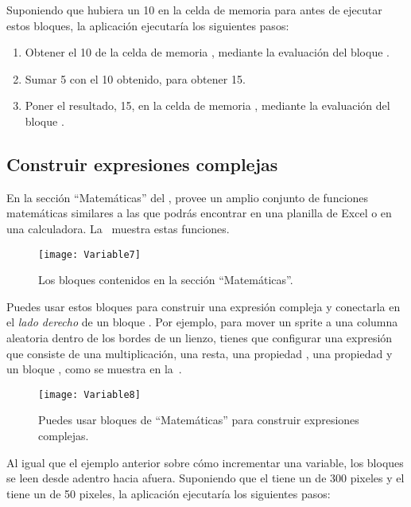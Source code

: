 Suponiendo que hubiera un 10 en la celda de memoria para
 antes de ejecutar estos bloques, la aplicación
ejecutaría los siguientes pasos:

\begin{enumerate}

\item Obtener el 10 de la celda de memoria ,
  mediante la evaluación del bloque .

\item Sumar 5 con el 10 obtenido, para obtener 15.
\item Poner el resultado, 15, en la celda de memoria
  , mediante la evaluación del bloque
  .
\end{enumerate}

\subsection*{Construir expresiones complejas}

En la sección ``Matemáticas'' del \blockEditor, \AppInventor provee un amplio conjunto de funciones matemáticas
similares a las que podrás encontrar en una planilla de Excel o en una
calculadora. La~ muestra estas funciones.

\begin{figure}[H]
\vspace{3em}
\centering
\texttt{[image: Variable7]}
\caption{Los bloques contenidos en la sección ``Matemáticas''.}
\label{fig:Variable7}
\end{figure}

Puedes usar estos bloques para construir una expresión compleja y
conectarla en el \emph{lado derecho} de un bloque .  Por ejemplo, para mover un sprite a una columna aleatoria
dentro de los bordes de un lienzo, tienes que configurar una expresión
que consiste de una multiplicación, una resta, una propiedad
, una propiedad  y
un bloque , como se muestra en
la~.

\begin{figure}[H]
\centering
\texttt{[image: Variable8]}
\caption{Puedes usar bloques de ``Matemáticas'' para construir expresiones complejas.}
\label{fig:Variable8}
\end{figure}

Al igual que el ejemplo anterior sobre cómo incrementar una variable, los bloques
se leen desde adentro hacia afuera. Suponiendo que el
 tiene un  de 300 pixeles y el
 tiene un  de 50 pixeles, la aplicación
ejecutaría los siguientes pasos:

